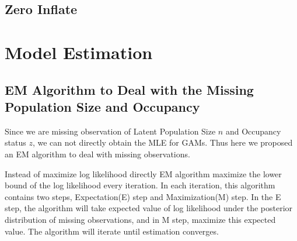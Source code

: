 \documentclass[]{article}
\begin{document}
\subsection{Zero Inflate}

\section{Model Estimation}
\subsection{EM Algorithm to Deal with the Missing Population Size and Occupancy}
Since we are missing observation of Latent Population Size $n$ and Occupancy status $z$, we can not directly obtain the MLE for GAMs. Thus here we proposed an EM algorithm to deal with missing observations.

Instead of maximize log likelihood directly EM algorithm maximize the lower bound of the log likelihood every iteration. In each iteration, this algorithm contains two steps, Expectation(E) step and Maximization(M) step. In the E step, the algorithm will take expected value of log likelihood under the posterior distribution of missing observations, and in M step, maximize this expected value. The algorithm will iterate until estimation converges. 
\end{document}
